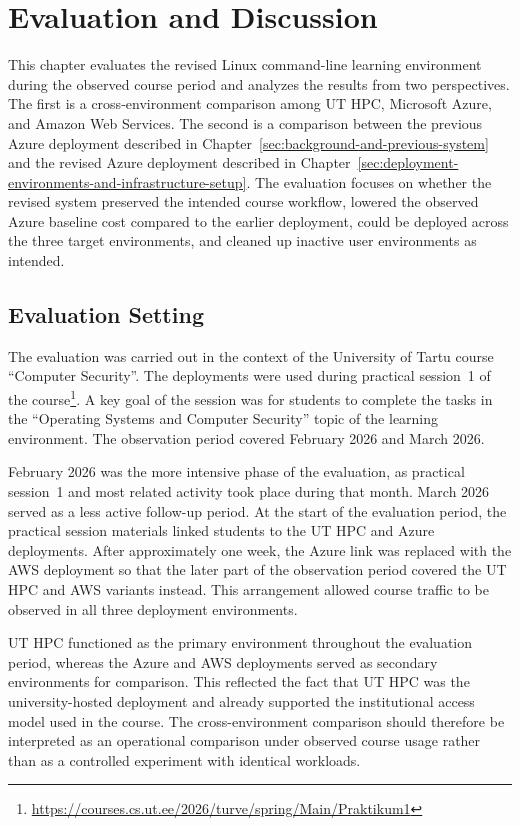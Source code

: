 

\section{Evaluation and Discussion} \label{sec:evaluation-and-discussion}
This chapter evaluates the revised Linux command-line learning environment during the observed course period and analyzes the results from two perspectives.
The first is a cross-environment comparison among UT HPC, Microsoft Azure, and Amazon Web Services.
The second is a comparison between the previous Azure deployment described in Chapter~\ref{sec:background-and-previous-system} and the revised Azure deployment described in Chapter~\ref{sec:deployment-environments-and-infrastructure-setup}.
The evaluation focuses on whether the revised system preserved the intended course workflow, lowered the observed Azure baseline cost compared to the earlier deployment, could be deployed across the three target environments, and cleaned up inactive user environments as intended.

\subsection{Evaluation Setting} \label{subsec:evaluation-setting}
The evaluation was carried out in the context of the University of Tartu course ``Computer Security''.
The deployments were used during practical session~1 of the course\footnote{\url{https://courses.cs.ut.ee/2026/turve/spring/Main/Praktikum1}}.
A key goal of the session was for students to complete the tasks in the ``Operating Systems and Computer Security'' topic of the learning environment.
The observation period covered February 2026 and March 2026.

February 2026 was the more intensive phase of the evaluation, as practical session~1 and most related activity took place during that month.
March 2026 served as a less active follow-up period.
At the start of the evaluation period, the practical session materials linked students to the UT HPC and Azure deployments.
After approximately one week, the Azure link was replaced with the AWS deployment so that the later part of the observation period covered the UT HPC and AWS variants instead.
This arrangement allowed course traffic to be observed in all three deployment environments.

UT HPC functioned as the primary environment throughout the evaluation period, whereas the Azure and AWS deployments served as secondary environments for comparison.
This reflected the fact that UT HPC was the university-hosted deployment and already supported the institutional access model used in the course.
The cross-environment comparison should therefore be interpreted as an operational comparison under observed course usage rather than as a controlled experiment with identical workloads.

